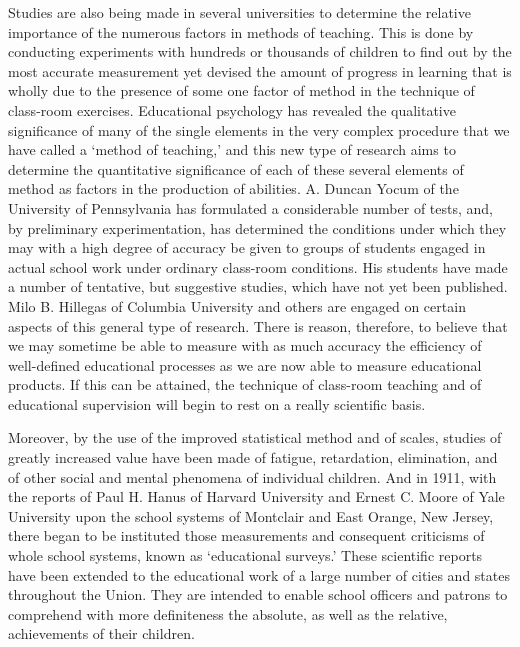 \documentclass[]{book}
\begin{document}
Studies are also being made in several universities to determine the relative importance of the numerous factors in methods of teaching. This is done by conducting experiments with hundreds or thousands of children to find out by the most accurate measurement yet devised the amount of progress in learning that is wholly due to the presence of some one factor of method in the technique of class-room exercises. Educational psychology has revealed the qualitative significance of many of the single elements in the very complex procedure that we have called a `method of teaching,' and this new type of research aims to determine the quantitative significance of each of these several elements of method as factors in the production of abilities. A. Duncan Yocum of the University of Pennsylvania has formulated a considerable number of tests, and, by preliminary experimentation, has determined the conditions under which they may with a high degree of accuracy be given to groups of students engaged in actual school work under ordinary class-room conditions. His students have made a number of tentative, but suggestive studies, which have not yet been published. Milo B. Hillegas of Columbia University and others are engaged on certain aspects of this general type of research. There is reason, therefore, to believe that we may sometime be able to measure with as much accuracy the efficiency of well-defined educational processes as we are now able to measure educational products. If this can be attained, the technique of class-room teaching and of educational supervision will begin to rest on a really scientific basis.

Moreover, by the use of the improved statistical method and of scales, studies of greatly increased value have been made of fatigue, retardation, elimination, and of other social and mental phenomena of individual children. And in 1911, with the reports of Paul H. Hanus of Harvard University and Ernest C. Moore of Yale University upon the school systems of Montclair and East Orange, New Jersey, there began to be instituted those measurements and consequent criticisms of whole school systems, known as `educational surveys.' These scientific reports have been extended to the educational work of a large number of cities and states throughout the Union. They are intended to enable school officers and patrons to comprehend with more definiteness the absolute, as well as the relative, achievements of their children.
\end{document}

